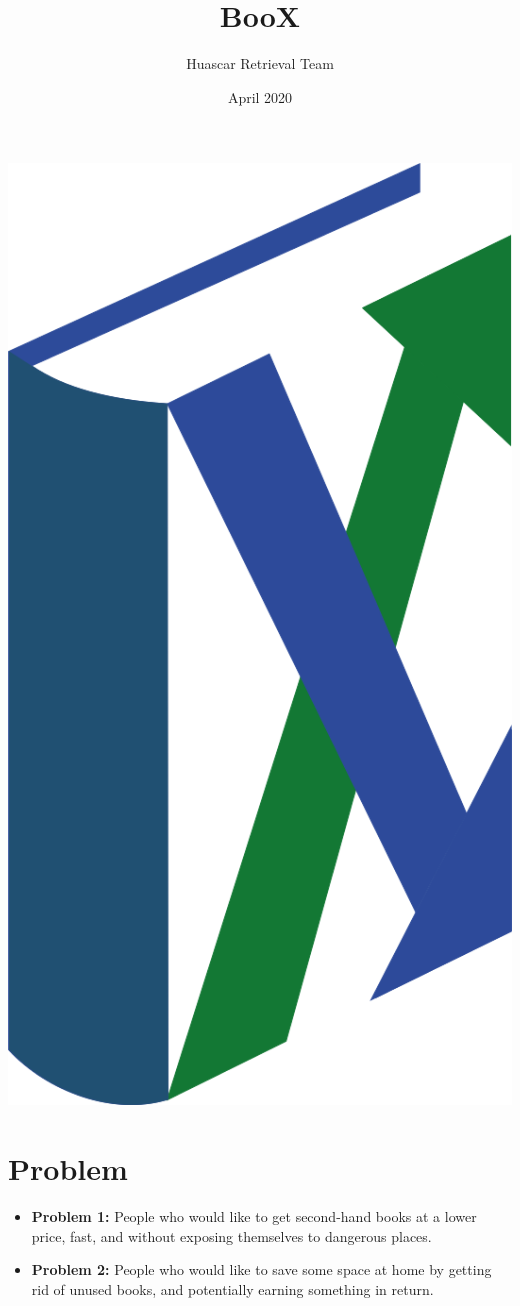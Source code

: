 \documentclass{article}
\title{BooX}
\author{Huascar Retrieval Team}
\date{April 2020}
\begin{document}
\maketitle
\begin{center}
    \includegraphics[scale=0.1]{img/logo.png}
\end{center}
\section{Problem}
\begin{itemize}[label={}]
    \item \textbf{Problem 1:} People who would like to get second-hand books at a lower price, fast, and without exposing themselves to dangerous places. 
    
    \item \textbf{Problem 2:} People who would like to save some space at home by getting rid of unused books, and potentially earning something in return.
    
\end{itemize}
\end{document}
